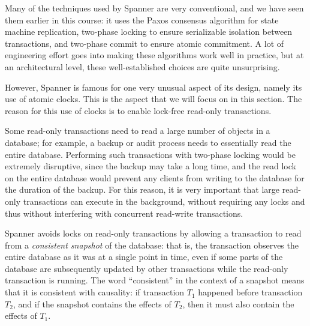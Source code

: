 Many of the techniques used by Spanner are very conventional, and we have seen them earlier in this course: it uses the Paxos consensus algorithm for state machine replication, two-phase locking to ensure serializable isolation between transactions, and two-phase commit to ensure atomic commitment.
A lot of engineering effort goes into making these algorithms work well in practice, but at an architectural level, these well-established choices are quite unsurprising.

However, Spanner is famous for one very unusual aspect of its design, namely its use of atomic clocks.
This is the aspect that we will focus on in this section.
The reason for this use of clocks is to enable lock-free read-only transactions.

Some read-only transactions need to read a large number of objects in a database; for example, a backup or audit process needs to essentially read the entire database.
Performing such transactions with two-phase locking would be extremely disruptive, since the backup may take a long time, and the read lock on the entire database would prevent any clients from writing to the database for the duration of the backup.
For this reason, it is very important that large read-only transactions can execute in the background, without requiring any locks and thus without interfering with concurrent read-write transactions.

Spanner avoids locks on read-only transactions by allowing a transaction to read from a \emph{consistent snapshot} of the database: that is, the transaction observes the entire database as it was at a single point in time, even if some parts of the database are subsequently updated by other transactions while the read-only transaction is running.
The word ``consistent'' in the context of a snapshot means that it is consistent with causality: if transaction $T_1$ happened before transaction $T_2$, and if the snapshot contains the effects of $T_2$, then it must also contain the effects of $T_1$.


